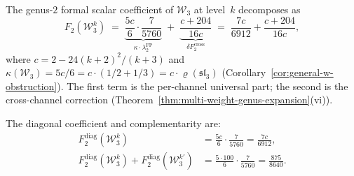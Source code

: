 \begin{proposition}\label{prop:w3-genus2-curvature}
The genus-$2$ formal scalar coefficient of $\mathcal{W}_3$ at level~$k$
decomposes as
\begin{equation}\label{eq:w3-obs2}
F_2(\mathcal{W}_3^k)
\;=\;
\underbrace{\frac{5c}{6} \cdot \frac{7}{5760}}_{\kappa\cdot\lambda_2^{\mathrm{FP}}}
\;+\;
\underbrace{\frac{c + 204}{16c}}_{\delta F_2^{\mathrm{cross}}}
\;=\;
\frac{7c}{6912} + \frac{c + 204}{16c},
\end{equation}
where $c = 2 - 24(k+2)^2/(k+3)$ and
$\kappa(\mathcal{W}_3) = 5c/6 = c \cdot (1/2 + 1/3)
= c \cdot \varrho(\mathfrak{sl}_3)$
\textup{(}Corollary~\textup{\ref{cor:general-w-obstruction}}).
The first term is the per-channel universal part; the second is the
cross-channel correction
\textup{(}Theorem~\textup{\ref{thm:multi-weight-genus-expansion}}(vi)\textup{)}.

The diagonal coefficient and complementarity are:
\begin{align}
F_2^{\mathrm{diag}}(\mathcal{W}_3^k) &= \frac{5c}{6} \cdot \frac{7}{5760}
= \frac{7c}{6912}, \label{eq:w3-F2} \\
F_2^{\mathrm{diag}}(\mathcal{W}_3^k) + F_2^{\mathrm{diag}}(\mathcal{W}_3^{k'})
&= \frac{5 \cdot 100}{6} \cdot \frac{7}{5760}
= \frac{875}{8640}. \label{eq:w3-F2-complementarity}
\end{align}
\end{proposition}

